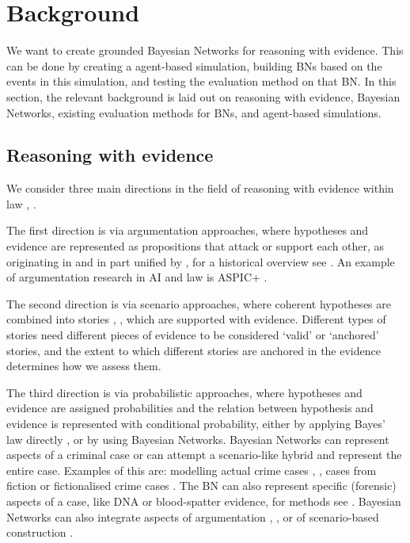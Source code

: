 \documentclass[12pt]{article}
\begin{document}
 

\newpage

\section{Background}

We want to create grounded Bayesian Networks for reasoning with evidence. This can be done by creating a agent-based simulation, building BNs based on the events in this simulation, and testing the evaluation method on that BN. In this section, the relevant background is laid out on reasoning with evidence, Bayesian Networks, existing evaluation methods for BNs, and agent-based simulations.


\subsection{Reasoning with evidence}
We consider three main directions in the field of reasoning with evidence within law \citep{Verheij2015}, \citep{diBelloVerheij2018}. 

The first direction is via argumentation approaches, where hypotheses and evidence are represented as propositions that attack or support each other, as originating in \citep{wigmore1931} and in part unified by \citet{dung1995}, for a historical overview see \citep{benchcapon2019}. An example of argumentation research in AI and law is ASPIC+ \citep{prakkenEtal2013}. 

The second direction is via scenario approaches, where coherent hypotheses are combined into stories \citep{penningtonHastie1993}, \citep{wagenaar1993}, which are supported with evidence. Different types of stories need different pieces of evidence to be considered `valid' or `anchored' stories, and the extent to which different stories are anchored in the evidence determines how we assess them. 

The third direction is via probabilistic approaches, where hypotheses and evidence are assigned probabilities and the relation between hypothesis and evidence is represented with conditional probability, either by applying Bayes' law directly \citep{dahlman2020}, or by using Bayesian Networks. Bayesian Networks can represent aspects of a criminal case or can attempt a scenario-like hybrid and represent the entire case. Examples of this are: modelling actual crime cases \citep{kadaneSchum1996}, \citep{Fenton2019},  cases from fiction \citep{Fenton2012} or fictionalised crime cases \citep{vanLeeuwen2019}. The BN can also represent specific (forensic) aspects of a case, like DNA or blood-spatter evidence, for methods see \citep{Meester2021}. Bayesian Networks can also integrate aspects of argumentation \citep{wieten2019}, \citep{timmer2016}, or of scenario-based construction \citep{vlek2016}.
\end{document}
